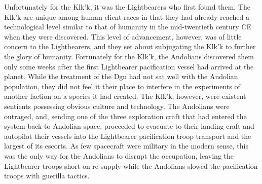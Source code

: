 Unfortunately for the Klk’k, it was the Lightbearers who first found them. The Klk’k are unique among human client races in that they had already reached a technological level similar to that of humanity in the mid-twentieth century CE when they were discovered. This level of advancement, however, was of little concern to the Lightbearers, and they set about subjugating the Klk’k to further the glory of humanity. Fortunately for the Klk’k, the Andolians discovered them only some weeks after the first Lightbearer pacification vessel had arrived at the planet. While the treatment of the Dgn had not sat well with the Andolian population, they did not feel it their place to interfere in the experiments of another faction on a species it had created. The Klk’k, however, were existent sentients possessing obvious culture and technology. The Andolians were outraged, and, sending one of the three exploration craft that had entered the system back to Andolian space, proceeded to evacuate to their landing craft and autopilot their vessels into the Lightbearer pacification troop transport and the largest of its escorts. As few spacecraft were military in the modern sense, this was the only way for the Andolians to disrupt the occupation, leaving the Lightbearer troops short on re-supply while the Andolians slowed the pacification troops with guerilla tactics.

